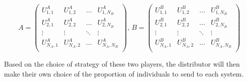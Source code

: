 \begin{equation} \label{eq:payoff_matrices}
    A = 
    \begin{pmatrix}
        U_{1,1}^A & U_{1,2}^A & \dots & U_{1,N_B}^A \\
        U_{2,1}^A & U_{2,2}^A & \dots & U_{2,N_B}^A \\
        \vdots & \vdots & \ddots & \vdots \\
        U_{N_A,1}^A & U_{N_A,2}^A & \dots & U_{N_A,N_B}^A \\
    \end{pmatrix}, \,
    B = 
    \begin{pmatrix}
        U_{1,1}^B & U_{1,2}^B & \dots & U_{1,N_B}^B \\
        U_{2,1}^B & U_{2,2}^B & \dots & U_{2,N_B}^B \\
        \vdots & \vdots & \ddots & \vdots \\
        U_{N_A,1}^B & U_{N_A,2}^B & \dots & U_{N_A,N_B}^B \\
    \end{pmatrix}
\end{equation}

Based on the choice of strategy of these two players, the distributor will then 
make their own choice of the proportion of individuals to send to each system.

